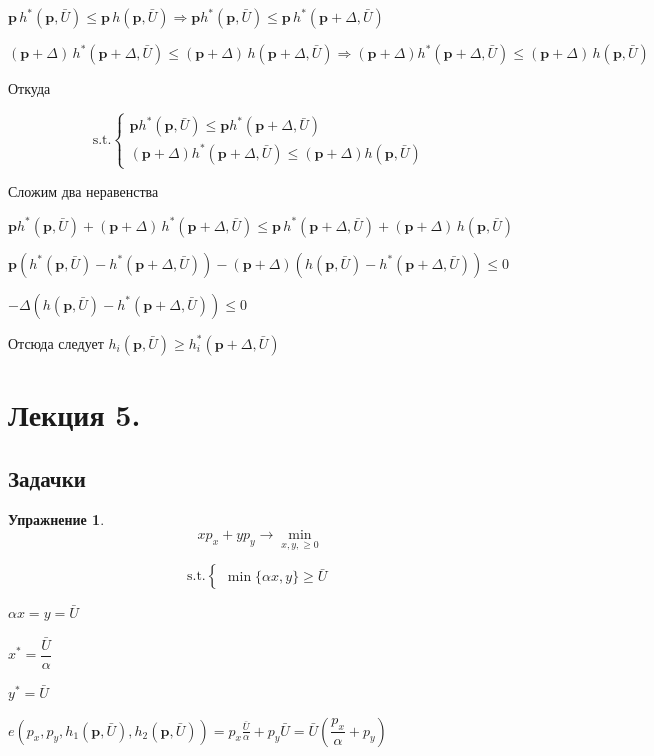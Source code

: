 \documentclass[reqno]{article}
\theoremstyle{definition}
\theoremstyle{definition}
\theoremstyle{definition}
\theoremstyle{definition}
\theoremstyle{definition}
\newtheorem{exc}{Упражнение}[section]
\theoremstyle{definition}
\theoremstyle{definition}
\theoremstyle{definition}
\theoremstyle{definition}
\begin{document}
\begin{itemize}
		$\textbf{p} \, h^*(\textbf{p},\bar{U}) \leq \textbf{p} \, h(\textbf{p},\bar{U}) \Rightarrow \textbf{p} h^*(\textbf{p},\bar{U}) \leq \textbf{p}\, h^*(\textbf{p} + \Delta,\bar{U})$
		
		$(\textbf{p}+\Delta) \, h^*(\textbf{p}+\Delta,\bar{U}) \leq (\textbf{p}+\Delta) \, h(\textbf{p}+\Delta,\bar{U}) \Rightarrow (\textbf{p}+\Delta) h^*(\textbf{p}+\Delta,\bar{U}) \leq (\textbf{p}+\Delta) \, h(\textbf{p},\bar{U})$
		
		Откуда
		
		$$
		\text{s.t.}
		\begin{cases}
			\textbf{p}h^*(\textbf{p},\bar{U}) \leq \textbf{p} h^*(\textbf{p} + \Delta,\bar{U})\\
			
			(\textbf{p}+\Delta) h^*(\textbf{p}+\Delta,\bar{U}) \leq (\textbf{p}+\Delta) h(\textbf{p},\bar{U})
		\end{cases}
		$$
		
		Сложим два неравенства
		
		$\textbf{p}h^*(\textbf{p},\bar{U}) + (\textbf{p}+\Delta) \, h^*(\textbf{p}+\Delta,\bar{U}) \leq \textbf{p} \, h^*(\textbf{p} + \Delta,\bar{U}) + (\textbf{p}+\Delta) \, h(\textbf{p},\bar{U})$
		
		$\textbf{p} (h^*(\textbf{p},\bar{U}) - h^*(\textbf{p} + \Delta,\bar{U})) - (\textbf{p}+\Delta) (h(\textbf{p},\bar{U}) - h^*(\textbf{p}+\Delta,\bar{U})) \leq 0$
		
		$- \Delta (h(\textbf{p},\bar{U}) - h^*(\textbf{p}+\Delta,\bar{U})) \leq 0$
		
		Отсюда следует $h_i(\textbf{p},\bar{U}) \geq h_i^*(\textbf{p}+\Delta,\bar{U})$
	\end{itemize}
	
	
	\newpage
	
	\section{Лекция 5.}
	
	\subsection{Задачки}
	
	\begin{exc}
		$$x p_x+y p_y \rightarrow \min\limits_{x,y,\geq 0}$$
		
		$$
		\text{s.t.}
		\begin{cases}
			\min\{\alpha x,y\} \geq \bar{U}
		\end{cases}
		$$
		
		$\alpha x = y = \bar{U}$
		
		$x^* = \dfrac{\bar{U}}{\alpha}$
		
		$y^* = \bar{U}$
		
		$e(p_x,p_y,h_1(\textbf{p},\bar{U}),h_2(\textbf{p},\bar{U})) = p_x \frac{\bar{U}}{\alpha} + p_y \bar{U} = \bar{U}(\dfrac{p_x}{\alpha} + p_y)$
	\end{exc}
\end{document}

